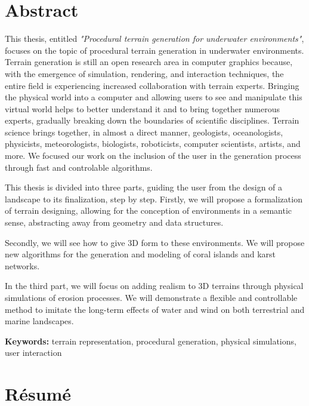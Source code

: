 \clearpage
\pagebreak

\section*{Abstract}
This thesis, entitled \textit{"Procedural terrain generation for underwater environments"}, focuses on the topic of procedural terrain generation in underwater environments. Terrain generation is still an open research area in computer graphics because, with the emergence of simulation, rendering, and interaction techniques, the entire field is experiencing increased collaboration with terrain experts. Bringing the physical world into a computer and allowing users to see and manipulate this virtual world helps to better understand it and to bring together numerous experts, gradually breaking down the boundaries of scientific disciplines. Terrain science brings together, in almost a direct manner, geologists, oceanologists, physicists, meteorologists, biologists, roboticists, computer scientists, artists, and more. We focused our work on the inclusion of the user in the generation process through fast and controlable algorithms.

This thesis is divided into three parts, guiding the user from the design of a landscape to its finalization, step by step.
Firstly, we will propose a formalization of terrain designing, allowing for the conception of environments in a semantic sense, abstracting away from geometry and data structures.

Secondly, we will see how to give 3D form to these environments. We will propose new algorithms for the generation and modeling of coral islands and karst networks.

In the third part, we will focus on adding realism to 3D terrains through physical simulations of erosion processes. We will demonstrate a flexible and controllable method to imitate the long-term effects of water and wind on both terrestrial and marine landscapes.

\textbf{Keywords:} terrain representation, procedural generation, physical simulations, user interaction

\section*{Résumé}

